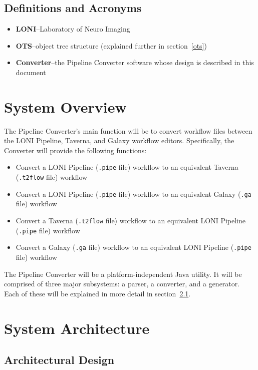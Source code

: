 \documentclass[12pt]{article}
\begin{document}
\subsection{Definitions and Acronyms}
\begin{itemize}
\item \textbf{LONI}--Laboratory of Neuro Imaging
\item \textbf{OTS}--object tree structure (explained further in section~\ref{ots})
\item \textbf{Converter}--the Pipeline Converter software whose design is described in this document
\end{itemize}

\section{System Overview}

The Pipeline Converter's main function will be to convert workflow files between the LONI Pipeline, Taverna, and Galaxy workflow editors. Specifically, the Converter will provide the following functions:

\begin{itemize}
\item    Convert a LONI Pipeline (\texttt{.pipe} file) workflow to an equivalent Taverna (\texttt{.t2flow} file) workflow
\item     Convert a LONI Pipeline (\texttt{.pipe} file) workflow to an equivalent Galaxy (\texttt{.ga} file) workflow
\item    Convert a Taverna (\texttt{.t2flow} file) workflow to an equivalent LONI Pipeline (\texttt{.pipe} file) workflow
\item    Convert a Galaxy (\texttt{.ga} file) workflow to an equivalent LONI Pipeline (\texttt{.pipe} file) workflow
\end{itemize}

The Pipeline Converter will be a platform-independent Java utility. It will be comprised of three major subsystems: a parser, a converter, and a generator. Each of these will be explained in more detail in section~\ref{archdesign}.

\section{System Architecture}

\subsection{Architectural Design}
\label{archdesign}
\end{document}
